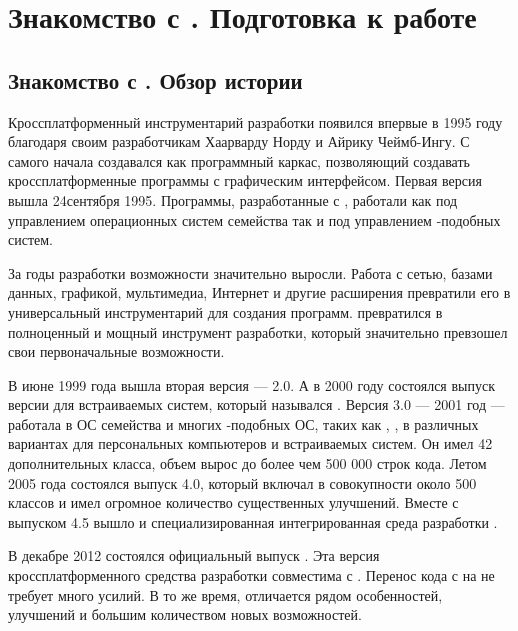 
\chapter{Знакомство с . Подготовка к работе}
\section[Знакомство с \Sys{Qt}. Обзор истории]{Знакомство с . Обзор истории}
Кроссплатформенный инструментарий разработки  появился впервые в 1995 году благодаря своим разработчикам
Хаарварду Норду и Айрику Чеймб-Ингу. С самого начала создавался как программный каркас, позволяющий 
создавать кроссплатформенные программы с графическим интерфейсом. Первая версия  вышла 
24сентября 1995. Программы, разработанные с , работали как под управлением операционных 
систем семейства  так и под управлением -подобных систем.

За годы разработки возможности  значительно выросли. Работа с сетью, базами данных, графикой,
мультимедиа, Интернет и другие расширения превратили его в универсальный инструментарий для создания программ. 
 превратился в полноценный и мощный инструмент разработки, который значительно превзошел свои первоначальные
возможности.

В июне 1999 года вышла вторая версия ---  2.0. А в 2000 году состоялся выпуск версии для встраиваемых
систем, который назывался . Версия  3.0 --- 2001 год --- работала в ОС семейства 
 и многих -подобных ОС, таких как , , в различных 
вариантах  для персональных компьютеров и встраиваемых
систем. Он имел 42 дополнительных класса, объем вырос до более чем 500 000 строк кода. Летом 2005 года состоялся выпуск
 4.0, который включал в совокупности около 500 классов и имел огромное количество существенных улучшений. Вместе с
выпуском  4.5 вышло и специализированная интегрированная
среда разработки .

В декабре 2012 состоялся официальный выпуск . Эта версия кроссплатформенного средства разработки
совместима с . Перенос кода с  на  не требует много усилий. В то же время, 
 отличается рядом особенностей,
улучшений и большим количеством новых возможностей.

